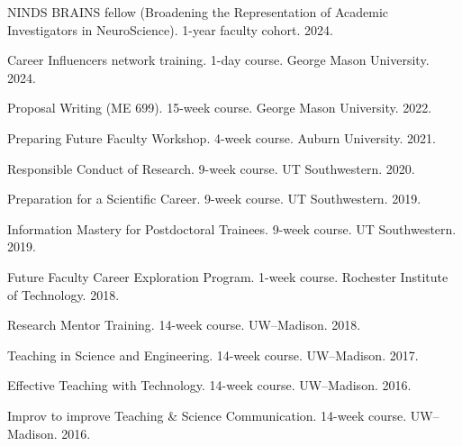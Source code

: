 \documentclass[letterpaper, 10pt]{article}
\begin{document}
\begin{compactenum}
     \item NINDS BRAINS fellow (Broadening the Representation of Academic Investigators in NeuroScience). 1-year faculty cohort. 2024.
     \item Career Influencers network training. 1-day course. George Mason University. 2024.
	\item Proposal Writing (ME 699). 15-week course. George Mason University. 2022.
	\item Preparing Future Faculty Workshop. 4-week course. Auburn University. 2021.
	\item Responsible Conduct of Research. 9-week course. UT Southwestern. 2020.
	\item Preparation for a Scientific Career. 9-week course. UT Southwestern. 2019.
	\item Information Mastery for Postdoctoral Trainees. 9-week course. UT Southwestern. 2019.
	\item Future Faculty Career Exploration Program. 1-week course. Rochester Institute of Technology. 2018.
	\item Research Mentor Training. 14-week course. UW--Madison. 2018.
	\item Teaching in Science and Engineering. 14-week course. UW--Madison. 2017.
	\item Effective Teaching with Technology. 14-week course. UW--Madison. 2016.
	\item Improv to improve Teaching \& Science Communication. 14-week course. UW--Madison. 2016.
\end{compactenum}

%
%
\end{document}
